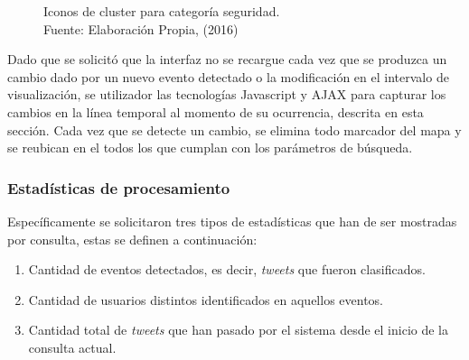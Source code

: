 \begin{figure}[H]
\centering
{}\hfill
{}\hfill
{}
\caption[Iconos de cluster para categoría seguridad.]{Iconos de cluster para categoría seguridad.\\Fuente: Elaboración Propia, (2016)}
\label{fig:clusterseguridad}
\end{figure}

Dado que se solicitó que la interfaz no se recargue cada vez que se produzca un cambio dado por un nuevo evento detectado o la modificación en el intervalo de visualización, se utilizador las tecnologías Javascript y AJAX para capturar los cambios en la línea temporal al momento de su ocurrencia, descrita en esta sección. Cada vez que se detecte un cambio, se elimina todo marcador del mapa y se reubican en el todos los que cumplan con los parámetros de búsqueda.

\subsubsection*{Estadísticas de procesamiento}
\label{subsubsec:estadisticasdeproc}

Específicamente se solicitaron tres tipos de estadísticas que han de ser mostradas por consulta, estas se definen a continuación:

\begin{enumerate}
\item Cantidad de eventos detectados, es decir, \textit{tweets} que fueron clasificados.
\item Cantidad de usuarios distintos identificados en aquellos eventos.
\item Cantidad total de \textit{tweets} que han pasado por el sistema desde el inicio de la consulta actual.
\end{enumerate}

